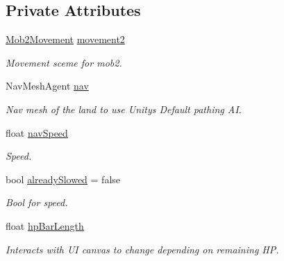 \subsection*{Private Attributes}
\begin{DoxyCompactItemize}
\item 
\mbox{\label{class_mob_health_a62d5d74d1e5f66d626fc1e76f2be84cc}} 
\hyperlink{class_mob2_movement}{Mob2\+Movement} \hyperlink{class_mob_health_a62d5d74d1e5f66d626fc1e76f2be84cc}{movement2}
\begin{DoxyCompactList}\small\item\em Movement sceme for mob2. \end{DoxyCompactList}\item 
\mbox{\label{class_mob_health_afb9d2d290a111506515407311408ed98}} 
Nav\+Mesh\+Agent \hyperlink{class_mob_health_afb9d2d290a111506515407311408ed98}{nav}
\begin{DoxyCompactList}\small\item\em Nav mesh of the land to use Unity\textquotesingle{}s Default pathing AI. \end{DoxyCompactList}\item 
\mbox{\label{class_mob_health_ac5aa23c1785ac8bdde4ca35b04b8967a}} 
float \hyperlink{class_mob_health_ac5aa23c1785ac8bdde4ca35b04b8967a}{nav\+Speed}
\begin{DoxyCompactList}\small\item\em Speed. \end{DoxyCompactList}\item 
\mbox{\label{class_mob_health_ac89dd915f414c757c3e0120ed403bb9b}} 
bool \hyperlink{class_mob_health_ac89dd915f414c757c3e0120ed403bb9b}{already\+Slowed} = false
\begin{DoxyCompactList}\small\item\em Bool for speed. \end{DoxyCompactList}\item 
\mbox{\label{class_mob_health_a452c19b63a316238a03bddd724a7e9ee}} 
float \hyperlink{class_mob_health_a452c19b63a316238a03bddd724a7e9ee}{hp\+Bar\+Length}
\begin{DoxyCompactList}\small\item\em Interacts with UI canvas to change depending on remaining HP. \end{DoxyCompactList}\item 

\end{DoxyCompactItemize}
